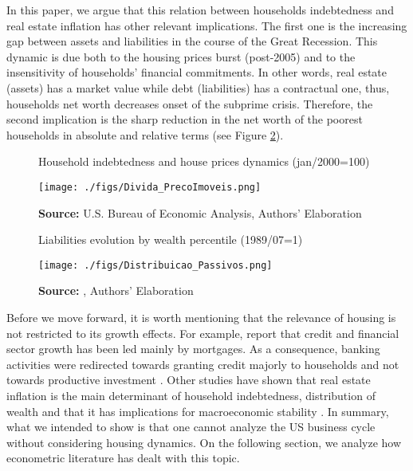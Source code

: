 \documentclass[11pt]{article}
\begin{document}
In this paper, we argue that this relation between households indebtedness and real estate inflation has other relevant implications.
The first one is the increasing gap between assets and liabilities in the course of the Great Recession.
This dynamic is due both to the housing prices burst (post-2005) and to the insensitivity of households' financial commitments.
In other words, real estate (assets) has a market value while debt (liabilities) has a contractual one, thus, households net worth decreases onset of the subprime crisis.
Therefore, the second implication is the sharp reduction in the net worth of the poorest households in absolute and relative terms (see Figure \ref{FigDistPassivos}).

\begin{figure}[H]
	\centering
	\caption{Household indebtedness and house prices dynamics (jan/2000=100)}
	\label{FigDividaPreco}
	\texttt{[image: ./figs/Divida\_PrecoImoveis.png]}
	\caption*{\textbf{Source:} U.S. Bureau of Economic Analysis, Authors' Elaboration}
\end{figure}

\begin{figure}[H]
	\centering
	\caption{Liabilities evolution by wealth percentile (1989/07=1)}
	\label{FigDistPassivos}
	\texttt{[image: ./figs/Distribuicao\_Passivos.png]}
	\caption*{\textbf{Source:} \textcite{us_census_bureau_characteristics_2017}, Authors' Elaboration}
\end{figure}



Before we move forward, it is worth mentioning that the relevance of housing is not restricted to its growth effects. 
For example, \textcite{jorda_great_2016} report that credit and financial sector growth has been led mainly by mortgages. 
As a consequence, banking activities were redirected towards granting credit majorly to households and not towards productive investment \cites{erturk_banks_2007}{kohl_more_2018}.
Other studies have shown that real estate inflation is the main determinant of household indebtedness, distribution of wealth and that it has implications for macroeconomic stability \cites{ryoo_household_2015}{stockhammer_debt-driven_2016}{barnes_private_2016}{johnston_global_2017}{mian_household_2017}{anderson_politics_2020}{fuller_housing_2020}. 
In summary, what we intended to show is that one cannot analyze the US business cycle without considering housing dynamics.
On the following section, we analyze how econometric literature has dealt with this topic.
\end{document}
